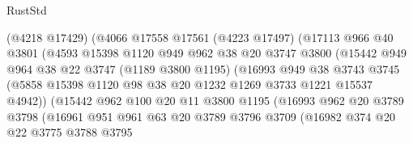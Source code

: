 \begin{lexlean}{RustStd}
\begin{coremodule}
                      (@4218 @17429)
                      (@4066
                        @17558
                        @17561
                        (@4223 @17497)
                        (@17113
                          @966
                          @40
                          @3801
                          (@4593
                            @15398
                            @1120
                            @949
                            @962
                            @38
                            @20
                            @3747
                            @3800
                            (@15442
                              @949
                              @964
                              @38
                              @22
                              @3747
                              (@1189 @3800 @1195)
                              (@16993
                                @949
                                @38
                                @3743
                                @3745
                                (@5858
                                  @15398
                                  @1120
                                  @98
                                  @38
                                  @20
                                  @1232
                                  @1269
                                  @3733
                                  @1221
                                  @15537
                                  @4942))
                              (@15442
                                @962
                                @100
                                @20
                                @11
                                @3800
                                @1195
                                (@16993
                                  @962
                                  @20
                                  @3789
                                  @3798
                                  (@16961
                                    @951
                                    @961
                                    @63
                                    @20
                                    @3789
                                    @3796
                                    @3709
                                    (@16982
                                      @374
                                      @20
                                      @22
                                      @3775
                                      @3788
                                      @3795

\end{coremodule}
\end{lexlean}
